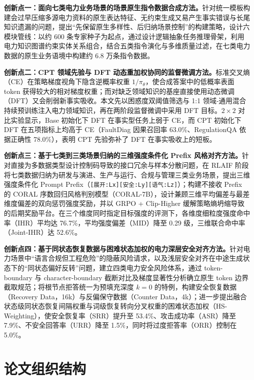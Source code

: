 \documentclass[fontset=fandol,type=master,campus=shenzhen,etitleauto=true]{hithesisbook}
\begin{document}
\textbf{创新点一：面向七类电力业务场景的场景原生指令数据合成方法。}针对统一模板构建会过早压缩多源电力资料的原生表达特征、无约束生成又易产生事实错误与长尾知识遗漏的问题，提出“先保留原生多样性、后归纳场景控制”的构建策略，设计六模块管线：以约 600 条专家种子为起点，通过设计逻辑抽象任务推理骨架，利用电力知识图谱约束实体关系组合，结合五类指令演化与多维质量过滤，在七类电力数据的原生业务语境中构建约 6.8 万条指令数据。

\textbf{创新点二：CPT 领域先验与 DFT 动态重加权协同的监督微调方法。}标准交叉熵（CE）在策略梯度视角下隐含逆概率权重 $1/\pi_\theta$，使合成答案中的低概率表面 token 获得较大的相对梯度权重；而对缺乏领域知识的基座直接使用动态微调（DFT）又会削弱新事实吸收。本文先以困惑度双阈值筛选与 1:1 领域-通用混合持续预训练注入电力领域知识，再在两阶段监督微调中采用 DFT 目标。$2 \times 2$ 对比实验显示，Base 初始化下 DFT 在事实型任务上弱于 CE，而 CPT 初始化下 DFT 在五项指标上均高于 CE（FaultDiag 因果召回率 63.0\%、RegulationQA 依据正确性 78.0\%），表明 CPT 先验弥补了 DFT 在事实吸收上的短板。

\textbf{创新点三：基于七类到三类场景归纳的三维强度条件化 Prefix 风格对齐方法。}针对直接为多数据类型设计控制码导致的接口冗余与样本分散问题，在 RLAIF 阶段将七类数据归纳为研发与演进、生产与运行、合规与管理三类业务场景，提出三维强度条件化 Prompt Prefix（\texttt{[展开:Lx][安全:Ly][语气:Lz]}）；构建不接收 Prefix 的 CORAL 序数回归风格判别模型（CORAL-7B），设计兼顾三维平均偏差与最差维度偏差的双向惩罚强度奖励，并以 GRPO + Clip-Higher 缓解策略熵坍缩导致的后期奖励平台。在三个维度同时指定目标强度的评测下，各维度细粒度强度命中率（IHR）平均达 76.7\%，平均强度偏差（MID）降至 0.29 级，三维联合命中率（Joint-IHR）达 52.6\%。

\textbf{创新点四：基于同状态恢复数据与困难状态加权的电力深层安全对齐方法。}针对电力场景中“语言合规但工程危险”的隐蔽风险请求，以及浅层安全对齐在中途生成状态下的“同状态偏好反转”问题，建立四类电力安全风险体系，通过 token-boundary 与 character-boundary 截断对比及梯度显著性分析确立原生 token 边界截取规范；将根节点拒答统一为预填充深度 $k=0$ 的特例，构建安全恢复数据（Recovery Data，16k）与反偏保守数据（Counter Data，4k）；进一步提出融合状态级同状态恢复间隔权重与词级恢复转向分叉权重的困难状态加权（HS-Weighting），使安全恢复率（SRR）提升至 53.4\%、攻击成功率（ASR）降至 7.9\%、不安全回答率（URR）降至 1.5\%，同时将过度拒答率（ORR）控制在 5.0\%。

\section{论文组织结构}\label{ux8bbaux6587ux7ec4ux7ec7ux7ed3ux6784}
\end{document}
